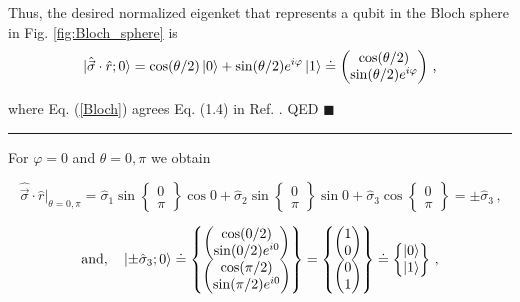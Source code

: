 \documentclass[11pt]{article}
\numberwithin{equation}{section} %
\numberwithin{figure}{section} %
\begin{document}
\begin{appendices}
\vspace{1cm}
Thus, the desired normalized eigenket that represents a qubit in the Bloch sphere in Fig. \ref{fig:Bloch_sphere} is
\begin{equation} \label{Bloch}
\ket{\hat{\vec{\sigma}}\cdot\hat{r};0}=\cos(\theta/2)\ket{0}+\sin(\theta/2)e^{i\varphi}\ket{1}\doteq\begin{pmatrix}\cos(\theta/2)\\\sin(\theta/2)e^{i\varphi}\end{pmatrix}\,\textrm{,}
\end{equation}

where Eq. (\ref{Bloch}) agrees Eq. (1.4) in Ref. \cite[p.~15]{Nielsen}. QED $\blacksquare$

\noindent
{\color{black} \rule{\linewidth}{0.2mm}}

\vspace{1cm}

For $\varphi=0$ and $\theta=0,\pi$ we obtain

\begin{equation} 
\hat{\vec{\sigma}}\cdot\hat{r}|_{\theta=0,\pi}=\hat{\sigma}_1\sin \begin{Bmatrix}0\\\pi\end{Bmatrix}\cos 0+\hat{\sigma}_2\sin\begin{Bmatrix}0\\\pi\end{Bmatrix} \sin 0+\hat{\sigma}_3\cos\begin{Bmatrix}0\\\pi\end{Bmatrix}=\pm\hat{\sigma}_3\,\textrm{,}
\end{equation}

\begin{equation} 
\textrm{and,}\quad\ket{\pm\hat{\sigma}_3;0}\doteq\begin{Bmatrix}\begin{pmatrix}\cos(0/2)\\\sin(0/2)e^{i0}\end{pmatrix}\\\begin{pmatrix}\cos(\pi/2)\\\sin(\pi/2)e^{i0}\end{pmatrix}\end{Bmatrix}=\begin{Bmatrix}\begin{pmatrix}1\\0\end{pmatrix}\\\begin{pmatrix}0\\1\end{pmatrix}\end{Bmatrix}\doteq \begin{Bmatrix}\ket{0}\\\ket{1}\end{Bmatrix}\,\textrm{,}
\end{equation}


\end{appendices}
\end{document}

